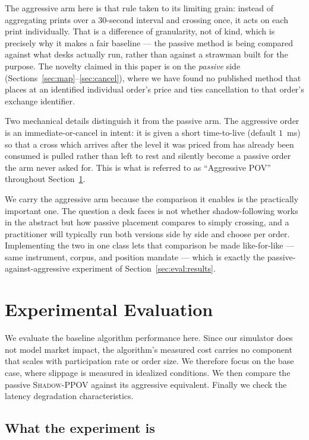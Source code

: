 \documentclass[11pt]{article}
\newcommand{\pov}{\textsc{Shadow-PPOV}}
\begin{document}
The aggressive arm here is that rule taken to its limiting grain: instead of
aggregating prints over a 30-second interval and crossing once, it acts on each
print individually. That is a difference of granularity, not of kind, which is
precisely why it makes a fair baseline --- the passive method is being compared
against what desks actually run, rather than against a strawman built for the
purpose. The novelty claimed in this paper is on the \emph{passive} side
(Sections~\ref{sec:map}--\ref{sec:cancel}), where we have found no published
method that places at an identified individual order's price and ties
cancellation to that order's exchange identifier.

Two mechanical details distinguish it from the passive arm. The
aggressive order is an immediate-or-cancel in intent: it is given a short
time-to-live (default $1$~ms) so that a cross which arrives after the level it
was priced from has already been consumed is pulled rather than left to rest and
silently become a passive order the arm never asked for. This is
what is referred to as ``Aggressive POV'' throughout Section~\ref{sec:eval}.

We carry the aggressive arm because the comparison it enables is the practically
important one. The question a desk faces is not whether shadow-following works in
the abstract but how passive placement compares to simply crossing, and a
practitioner will typically run both versions side by side and choose per order.
Implementing the two in one class lets that comparison be made like-for-like ---
same instrument, corpus, and position mandate --- which is exactly the
passive-against-aggressive experiment of Section~\ref{sec:eval:results}.

\section{Experimental Evaluation}
\label{sec:eval}


We evaluate the baseline algorithm performance here. Since our simulator does not
model market impact, the algorithm's measured cost carries no component that
scales with participation rate or order size. We therefore focus on the base
case, where slippage is measured in idealized conditions. We then compare the
passive \pov{} against its aggressive equivalent. Finally we check the latency
degradation characteristics.

\subsection{What the experiment is}
\label{sec:eval:setup}
\end{document}
